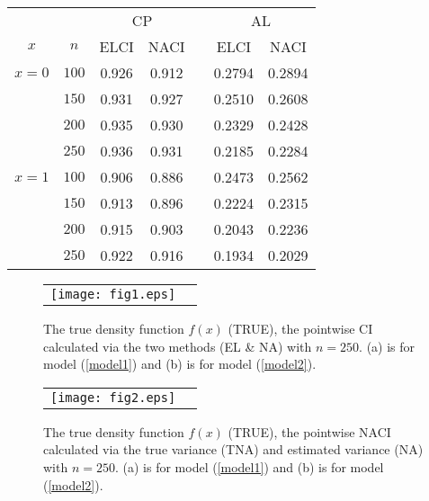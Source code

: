 \documentclass[12pt]{article}
\renewcommand{\baselinestretch}{1.25}
\def\vv{1.3}
\begin{document}
\begin{center}
\begin{tabular}{ccccccc}
\hline  &   & \multicolumn{2}{c}{CP}
     &&\multicolumn{2}{c}{AL}\\
\cline{3-4} \cline{6-7}
$x$ & $n$ &  ELCI   & NACI   && ELCI  & NACI  \\
\cline{3-4} \cline{6-7}
 $x=0$ & $100$  & 0.926  & 0.912 & &  0.2794& 0.2894 \\
          & $150$  &  0.931 & 0.927 & & 0.2510 & 0.2608 \\
          & $200$  &  0.935  & 0.930 & & 0.2329& 0.2428 \\
          & $250$  &  0.936 & 0.931  & & 0.2185& 0.2284\\
$x=1$ & $100$  & 0.906  & 0.886 & &  0.2473& 0.2562 \\
          & $150$  &  0.913 & 0.896& & 0.2224 & 0.2315 \\
          & $200$  &  0.915  & 0.903 & & 0.2043& 0.2236 \\
          & $250$  &  0.922 & 0.916  & & 0.1934& 0.2029\\
 \hline
\end{tabular}
\end{center}


\renewcommand{\baselinestretch}{\vv}

\begin{figure}[htbp]
\begin{tabular}{cc}
\texttt{[image: fig1.eps]}  %
\end{tabular}
\caption{ The true density function $f(x)$ (TRUE),
the pointwise CI calculated via the two methods (EL \& NA) with $n=250$. (a) is for model (\ref{model1}) and (b) is for model (\ref{model2}).   }
    \label{fig1}
\end{figure}


\renewcommand{\baselinestretch}{\vv}

\begin{figure}[htbp]
\begin{tabular}{cc}
\texttt{[image: fig2.eps]}  %
\end{tabular}
\caption{ The true density function $f(x)$ (TRUE),
the pointwise NACI calculated via the true variance (TNA) and estimated variance (NA) with $n=250$. (a) is for model (\ref{model1}) and (b) is for model (\ref{model2}). }
    \label{fig2}
\end{figure}
\end{document}

